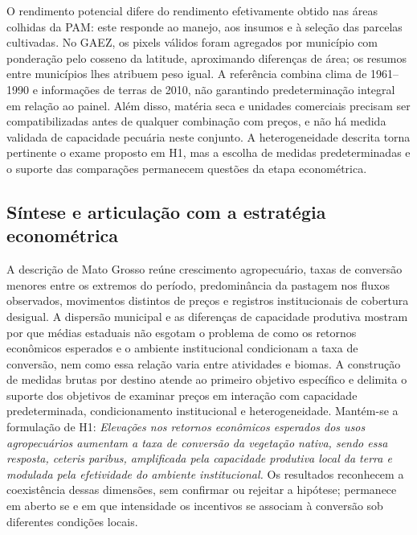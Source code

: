 
\FloatBarrier

O rendimento potencial difere do rendimento efetivamente obtido nas áreas colhidas da PAM: este responde ao manejo, aos insumos e à seleção das parcelas cultivadas. No GAEZ, os pixels válidos foram agregados por município com ponderação pelo cosseno da latitude, aproximando diferenças de área; os resumos entre municípios lhes atribuem peso igual. A referência combina clima de 1961--1990 e informações de terras de 2010, não garantindo predeterminação integral em relação ao painel. Além disso, matéria seca e unidades comerciais precisam ser compatibilizadas antes de qualquer combinação com preços, e não há medida validada de capacidade pecuária neste conjunto. A heterogeneidade descrita torna pertinente o exame proposto em H1, mas a escolha de medidas predeterminadas e o suporte das comparações permanecem questões da etapa econométrica.

\subsection{Síntese e articulação com a estratégia econométrica}
\label{subsec:mt-sintese}

A descrição de Mato Grosso reúne crescimento agropecuário, taxas de conversão menores entre os extremos do período, predominância da pastagem nos fluxos observados, movimentos distintos de preços e registros institucionais de cobertura desigual. A dispersão municipal e as diferenças de capacidade produtiva mostram por que médias estaduais não esgotam o problema de como os retornos econômicos esperados e o ambiente institucional condicionam a taxa de conversão, nem como essa relação varia entre atividades e biomas. A construção de medidas brutas por destino atende ao primeiro objetivo específico e delimita o suporte dos objetivos de examinar preços em interação com capacidade predeterminada, condicionamento institucional e heterogeneidade. Mantém-se a formulação de H1: \emph{Elevações nos retornos econômicos esperados dos usos agropecuários aumentam a taxa de conversão da vegetação nativa, sendo essa resposta, \textit{ceteris paribus}, amplificada pela capacidade produtiva local da terra e modulada pela efetividade do ambiente institucional.} Os resultados reconhecem a coexistência dessas dimensões, sem confirmar ou rejeitar a hipótese; permanece em aberto se e em que intensidade os incentivos se associam à conversão sob diferentes condições locais.

